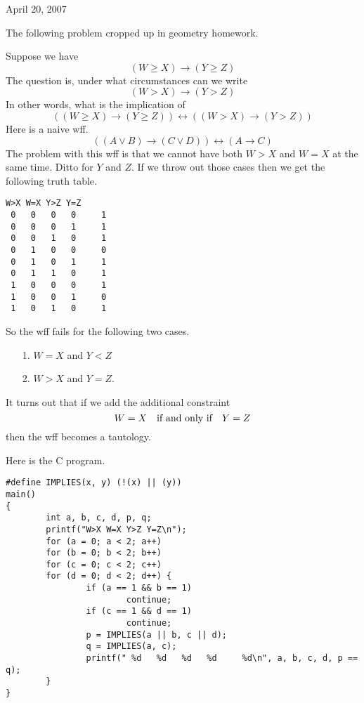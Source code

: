 \documentclass[12pt,openany]{report}
\begin{document}
\noindent
April 20, 2007

\bigskip
\noindent
The following problem cropped up in geometry homework.

\bigskip
\noindent
Suppose we have
$$(W\ge X)\rightarrow(Y\ge Z)$$
The question is, under what circumstances can we write
$$(W>X)\rightarrow(Y>Z)$$
In other words, what is the implication of
$$((W\ge X)\rightarrow(Y\ge Z))\leftrightarrow((W>X)\rightarrow(Y>Z))$$
%
Here is a naive wff.
$$((A\vee B)\rightarrow(C\vee D))\leftrightarrow(A\rightarrow C)$$
The problem with this wff is that we cannot have both $W>X$ and $W=X$ at the same time.
Ditto for $Y$ and $Z$.
If we throw out those cases then we get the following truth table.

\begin{verbatim}
W>X W=X Y>Z Y=Z
 0   0   0   0     1
 0   0   0   1     1
 0   0   1   0     1
 0   1   0   0     0
 0   1   0   1     1
 0   1   1   0     1
 1   0   0   0     1
 1   0   0   1     0
 1   0   1   0     1
\end{verbatim}

\noindent
So the wff fails for the following two cases.

\begin{itemize}

\item[1.]
$W=X$ and $Y<Z$

\item[2.]
$W>X$ and $Y=Z$.

\end{itemize}

\noindent
It turns out that if we add the additional constraint
$$W=X\quad\hbox{if and only if}\quad Y=Z$$
then the wff becomes a tautology.

\newpage

\noindent
Here is the C program.

\begin{verbatim}
#define IMPLIES(x, y) (!(x) || (y))
main()
{
        int a, b, c, d, p, q;
        printf("W>X W=X Y>Z Y=Z\n");
        for (a = 0; a < 2; a++)
        for (b = 0; b < 2; b++)
        for (c = 0; c < 2; c++)
        for (d = 0; d < 2; d++) {
                if (a == 1 && b == 1)
                        continue;
                if (c == 1 && d == 1)
                        continue;
                p = IMPLIES(a || b, c || d);
                q = IMPLIES(a, c);
                printf(" %d   %d   %d   %d     %d\n", a, b, c, d, p == q);
        }
}
\end{verbatim}
\end{document}
